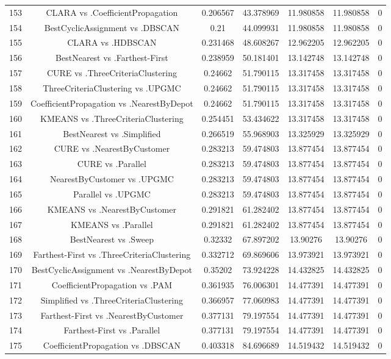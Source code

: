 \documentclass[a4paper,10pt]{article}
\begin{document}
\begin{landscape}
\begin{table}[!htp]
\begin{tabular}{ccccccc}
153&CLARA vs .CoefficientPropagation&0.206567&43.378969&11.980858&11.980858&0\\
154&BestCyclicAssignment vs .DBSCAN&0.21&44.099931&11.980858&11.980858&0\\
155&CLARA vs .HDBSCAN&0.231468&48.608267&12.962205&12.962205&0\\
156&BestNearest vs .Farthest-First&0.238959&50.181401&13.142748&13.142748&0\\
157&CURE vs .ThreeCriteriaClustering&0.24662&51.790115&13.317458&13.317458&0\\
158&ThreeCriteriaClustering vs .UPGMC&0.24662&51.790115&13.317458&13.317458&0\\
159&CoefficientPropagation vs .NearestByDepot&0.24662&51.790115&13.317458&13.317458&0\\
160&KMEANS vs .ThreeCriteriaClustering&0.254451&53.434622&13.317458&13.317458&0\\
161&BestNearest vs .Simplified&0.266519&55.968903&13.325929&13.325929&0\\
162&CURE vs .NearestByCustomer&0.283213&59.474803&13.877454&13.877454&0\\
163&CURE vs .Parallel&0.283213&59.474803&13.877454&13.877454&0\\
164&NearestByCustomer vs .UPGMC&0.283213&59.474803&13.877454&13.877454&0\\
165&Parallel vs .UPGMC&0.283213&59.474803&13.877454&13.877454&0\\
166&KMEANS vs .NearestByCustomer&0.291821&61.282402&13.877454&13.877454&0\\
167&KMEANS vs .Parallel&0.291821&61.282402&13.877454&13.877454&0\\
168&BestNearest vs .Sweep&0.32332&67.897202&13.90276&13.90276&0\\
169&Farthest-First vs .ThreeCriteriaClustering&0.332712&69.869606&13.973921&13.973921&0\\
170&BestCyclicAssignment vs .NearestByDepot&0.35202&73.924228&14.432825&14.432825&0\\
171&CoefficientPropagation vs .PAM&0.361935&76.006301&14.477391&14.477391&0\\
172&Simplified vs .ThreeCriteriaClustering&0.366957&77.060983&14.477391&14.477391&0\\
173&Farthest-First vs .NearestByCustomer&0.377131&79.197554&14.477391&14.477391&0\\
174&Farthest-First vs .Parallel&0.377131&79.197554&14.477391&14.477391&0\\
175&CoefficientPropagation vs .DBSCAN&0.403318&84.696689&14.519432&14.519432&0\\

\end{tabular}
\end{table}
\end{landscape}
\end{document}
